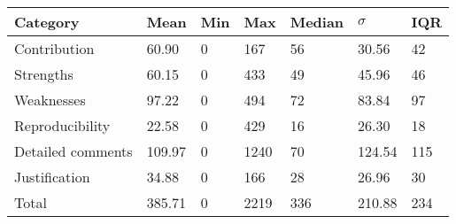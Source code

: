\begin{tabular}{lllllll}
\hline
Category & Mean & Min & Max & Median & $\sigma$ & IQR \\ 
\hline
Contribution & 60.90 & 0 & 167 & 56 & 30.56 & 42 \\
Strengths & 60.15 & 0 & 433 & 49 & 45.96 & 46 \\
Weaknesses & 97.22 & 0 & 494 & 72 & 83.84 & 97 \\
Reproducibility & 22.58 & 0 & 429 & 16 & 26.30 & 18 \\
Detailed comments & 109.97 & 0 & 1240 & 70 & 124.54 & 115 \\
Justification & 34.88 & 0 & 166 & 28 & 26.96 & 30 \\
\hline
Total & 385.71 & 0 & 2219 & 336 & 210.88 & 234 \\
\hline
\end{tabular}
